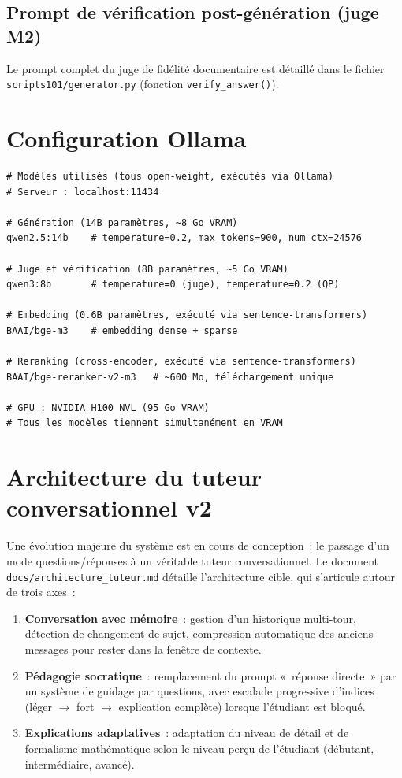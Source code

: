\documentclass[11pt,a4paper]{article}
\begin{document}
\subsection*{Prompt de vérification post-génération (juge M2)}

Le prompt complet du juge de fidélité documentaire est détaillé dans le fichier
\texttt{scripts101/generator.py} (fonction \texttt{verify\_answer()}).

\section{Configuration Ollama}
\label{app:config-ollama}

\begin{verbatim}
# Modèles utilisés (tous open-weight, exécutés via Ollama)
# Serveur : localhost:11434

# Génération (14B paramètres, ~8 Go VRAM)
qwen2.5:14b    # temperature=0.2, max_tokens=900, num_ctx=24576

# Juge et vérification (8B paramètres, ~5 Go VRAM)
qwen3:8b       # temperature=0 (juge), temperature=0.2 (QP)

# Embedding (0.6B paramètres, exécuté via sentence-transformers)
BAAI/bge-m3    # embedding dense + sparse

# Reranking (cross-encoder, exécuté via sentence-transformers)
BAAI/bge-reranker-v2-m3   # ~600 Mo, téléchargement unique

# GPU : NVIDIA H100 NVL (95 Go VRAM)
# Tous les modèles tiennent simultanément en VRAM
\end{verbatim}

\section{Architecture du tuteur conversationnel v2}
\label{app:architecture-v2}

Une évolution majeure du système est en cours de conception~: le passage d'un mode questions/réponses à un véritable tuteur conversationnel. Le document \texttt{docs/architecture\_tuteur.md} détaille l'architecture cible, qui s'articule autour de trois axes~:

\begin{enumerate}
  \item \textbf{Conversation avec mémoire}~: gestion d'un historique multi-tour, détection de changement de sujet, compression automatique des anciens messages pour rester dans la fenêtre de contexte.
  \item \textbf{Pédagogie socratique}~: remplacement du prompt «~réponse directe~» par un système de guidage par questions, avec escalade progressive d'indices (léger $\to$ fort $\to$ explication complète) lorsque l'étudiant est bloqué.
  \item \textbf{Explications adaptatives}~: adaptation du niveau de détail et de formalisme mathématique selon le niveau perçu de l'étudiant (débutant, intermédiaire, avancé).
\end{enumerate}
\end{document}
